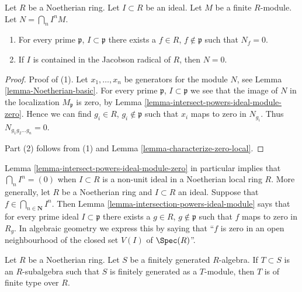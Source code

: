 \begin{lemma}
\label{lemma-intersection-powers-ideal-module}
Let $R$ be a Noetherian ring. Let $I \subset R$ be an ideal.
Let $M$ be a finite $R$-module. Let $N = \bigcap_n I^n M$.
\begin{enumerate}
\item For every prime $\mathfrak p$, $I \subset \mathfrak p$ there
exists a $f \in R$, $f \not \in \mathfrak p$ such that $N_f = 0$.
\item If $I$ is contained in the Jacobson radical
of $R$, then $N = 0$.
\end{enumerate}
\end{lemma}

\begin{proof}
Proof of (1). Let $x_1, \ldots, x_n$ be generators for the module $N$,
see Lemma \ref{lemma-Noetherian-basic}. For every prime
$\mathfrak p$, $I \subset \mathfrak p$ we see that
the image of $N$ in the localization $M_{\mathfrak p}$
is zero, by Lemma \ref{lemma-intersect-powers-ideal-module-zero}.
Hence we can find $g_i \in R$, $g_i \not \in \mathfrak p$
such that $x_i$ maps to zero in $N_{g_i}$. Thus
$N_{g_1g_2\ldots g_n} = 0$.

\medskip\noindent
Part (2) follows from (1) and Lemma \ref{lemma-characterize-zero-local}.
\end{proof}

\begin{remark}
\label{remark-intersection-powers-ideal}
Lemma \ref{lemma-intersect-powers-ideal-module-zero} in particular implies
that $\bigcap_n I^n = (0)$ when $I \subset R$ is a non-unit ideal in a
Noetherian local ring $R$. More generally, let $R$ be a Noetherian ring and
$I \subset R$ an ideal. Suppose that $f \in \bigcap_{n \in \mathbf{N}} I^n$.
Then Lemma \ref{lemma-intersection-powers-ideal-module}
says that for every prime ideal $I \subset \mathfrak p$
there exists a $g \in R$, $g \not \in \mathfrak p$
such that $f$ maps to zero in $R_g$. In algebraic geometry we
express this by saying that ``$f$ is zero in an open neighbourhood
of the closed set $V(I)$ of $\Spec(R)$''.
\end{remark}

\begin{lemma}
\label{lemma-Artin-Tate}
Let $R$ be a Noetherian ring. Let $S$ be a finitely
generated $R$-algebra. If $T \subset S$ is an $R$-subalgebra such
that $S$ is finitely generated as a $T$-module, then $T$ is of
finite type over $R$.
\end{lemma}

